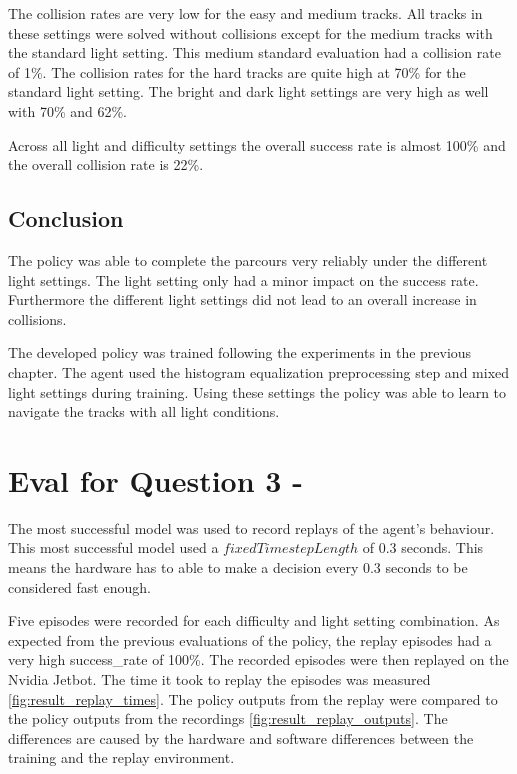 The collision rates are very low for the easy and medium tracks. All tracks in these settings were solved without collisions except for the medium tracks with the standard light setting. This medium standard evaluation had a collision rate of 1\%.
The collision rates for the hard tracks are quite high at 70\% for the standard light setting. The bright and dark light settings are very high as well with 70\% and 62\%.

Across all light and difficulty settings the overall success rate is almost 100\% and the overall collision rate is 22\%.

\subsection{Conclusion}

The policy was able to complete the parcours very reliably under the different light settings. The light setting only had a minor impact on the success rate.
Furthermore the different light settings did not lead to an overall increase in collisions.

The developed policy was trained following the experiments in the previous chapter. The agent used the histogram equalization preprocessing step and mixed light settings during training. Using these settings the policy was able to learn to navigate the tracks with all light conditions.


\section{Eval for Question 3 - \questionThree}

The most successful model was used to record replays of the agent's behaviour. This most successful model used a $fixedTimestepLength$ of $0.3$ seconds. This means the hardware has to able to make a decision every $0.3$ seconds to be considered fast enough.

Five episodes were recorded for each difficulty and light setting combination. As expected from the previous evaluations of the policy, the replay episodes had a very high success\_rate of 100\%. The recorded episodes were then replayed on the Nvidia Jetbot. The time it took to replay the episodes was measured \ref{fig:result_replay_times}. The policy outputs from the replay were compared to the policy outputs from the recordings \ref{fig:result_replay_outputs}. The differences are caused by the hardware and software differences between the training and the replay environment.


